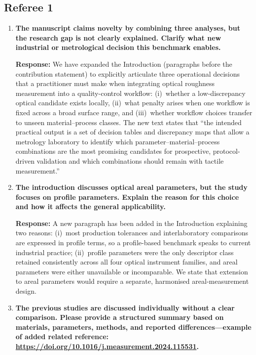\documentclass[10pt]{article}
\begin{document}
\subsection*{Referee 1}

\begin{enumerate}[leftmargin=*, label=\textbf{Comment \arabic*.}, ref=\arabic*]

\item \textbf{The manuscript claims novelty by combining three analyses, but the research gap is not clearly explained. Clarify what new industrial or metrological decision this benchmark enables.}

\textbf{Response:} We have expanded the Introduction (paragraphs before the contribution statement) to explicitly articulate three operational decisions that a practitioner must make when integrating optical roughness measurement into a quality-control workflow: (i)~whether a low-discrepancy optical candidate exists locally, (ii)~what penalty arises when one workflow is fixed across a broad surface range, and (iii)~whether workflow choices transfer to unseen material--process classes. The new text states that ``the intended practical output is a set of decision tables and discrepancy maps that allow a metrology laboratory to identify which parameter--material--process combinations are the most promising candidates for prospective, protocol-driven validation and which combinations should remain with tactile measurement.''

\item \textbf{The introduction discusses optical areal parameters, but the study focuses on profile parameters. Explain the reason for this choice and how it affects the general applicability.}

\textbf{Response:} A new paragraph has been added in the Introduction explaining two reasons: (i)~most production tolerances and interlaboratory comparisons are expressed in profile terms, so a profile-based benchmark speaks to current industrial practice; (ii)~profile parameters were the only descriptor class retained consistently across all four optical instrument families, and areal parameters were either unavailable or incomparable. We state that extension to areal parameters would require a separate, harmonised areal-measurement design.

\item \textbf{The previous studies are discussed individually without a clear comparison. Please provide a structured summary based on materials, parameters, methods, and reported differences---example of added related reference: \url{https://doi.org/10.1016/j.measurement.2024.115531}.}


\end{enumerate}
\end{document}
